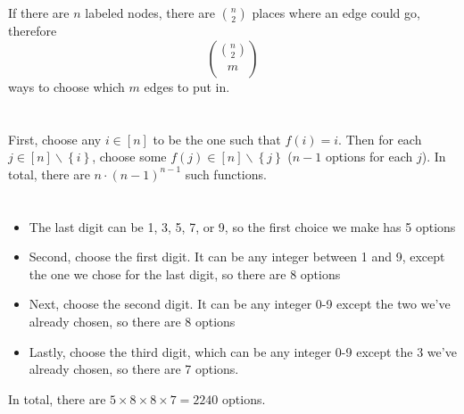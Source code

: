 \documentclass[12pt]{article}
\begin{document}
\section{}
\noindent{}\bigskip\par
If there are $n$ labeled nodes, there are $\binom{n}{2}$ places where an edge could go, therefore
\[ \binom{\binom{n}{2}}{m} \]
ways to choose which $m$ edges to put in.

\section{}
\noindent{}\bigskip\par
First, choose any $i \in [n]$ to be the one such that $f(i)=i$. Then for each $j \in [n] \backslash \left\{ i \right\}$, choose some $f(j) \in [n] \backslash \left\{ j \right\}$ ($n-1$ options for each $j$). In total, there are $n \cdot (n-1)^{n-1}$ such functions.

\section{}
\noindent{}\bigskip\par
\begin{itemize}
    \item The last digit can be 1, 3, 5, 7, or 9, so the first choice we make has 5 options
    \item Second, choose the first digit. It can be any integer between 1 and 9, except the one we chose for the last digit, so there are 8 options
    \item Next, choose the second digit. It can be any integer 0-9 except the two we've already chosen, so there are 8 options
    \item Lastly, choose the third digit, which can be any integer 0-9 except the 3 we've already chosen, so there are 7 options.
\end{itemize}
In total, there are $5 \times 8 \times 8 \times 7 = 2240$ options.
\end{document}
